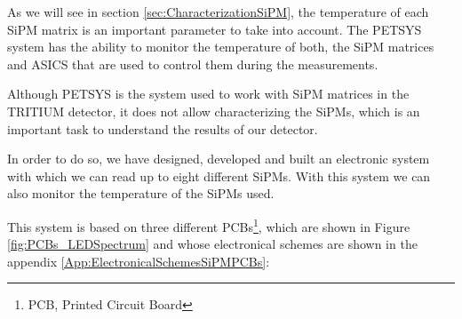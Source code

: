 As we will see in section \ref{sec:CharacterizationSiPM}, the temperature of each SiPM matrix is an important parameter to take into account. The PETSYS system has the ability to monitor the temperature of both, the SiPM matrices and ASICS that are used to control them during the measurements.

Although PETSYS is the system used to work with SiPM matrices in the TRITIUM detector, it does not allow characterizing the SiPMs, which is an important task to understand the results of our detector.

In order to do so, we have designed, developed and built an electronic system with which we can read up to eight different SiPMs. With this system we can also monitor the temperature of the SiPMs used.

This system is based on three different PCBs\footnote{PCB, Printed Circuit Board}, which are shown in Figure \ref{fig:PCBs_LEDSpectrum} and whose electronical schemes are shown in the appendix \ref{App:ElectronicalSchemesSiPMPCBs}:

